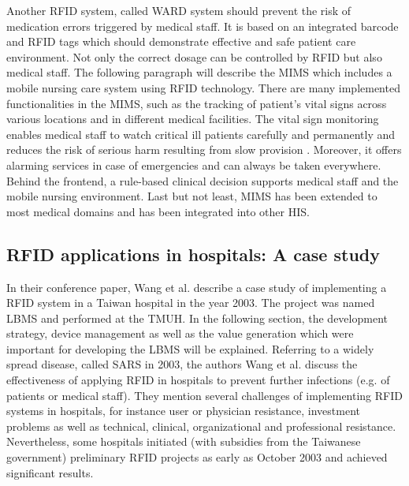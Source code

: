 Another RFID system, called \ac{WARD} system should prevent the risk of medication errors triggered by medical staff. It is based on an integrated barcode and RFID tags which should demonstrate effective and safe patient care environment. 
Not only the correct dosage can be controlled by RFID but also medical staff. The following paragraph will describe the \ac{MIMS} which includes a mobile nursing care system using RFID technology. There are many implemented functionalities in the MIMS, such as the tracking of patient's vital signs across various locations and in different medical facilities. The vital sign monitoring enables medical staff to watch critical ill patients carefully and permanently and reduces the risk of serious harm resulting from slow provision \cite{ncbi}. Moreover, it offers alarming services in case of emergencies and can always be taken everywhere. Behind the frontend, a rule-based clinical decision supports medical staff and the mobile nursing environment. Last but not least, MIMS has been extended to most medical domains and has been integrated into other HIS.

\subsection{RFID applications in hospitals: A case study}

In their conference paper, Wang et al. \cite{casestudy} describe a case study of implementing a RFID system in a Taiwan hospital in the year 2003. The project was named \ac{LBMS} and performed at the \ac{TMUH}. In the following section, the development strategy, device management as well as the value generation which were important for developing the LBMS will be explained. 
Referring to a widely spread disease, called \ac{SARS} in 2003, the authors Wang et al. discuss the effectiveness of applying RFID in hospitals to prevent further infections (e.g. of patients or medical staff). They mention several challenges of implementing RFID systems in hospitals, for instance user or physician resistance, investment problems as well as technical, clinical, organizational and professional resistance. Nevertheless, some hospitals initiated (with subsidies from the Taiwanese government) preliminary RFID projects as early as October 2003 and achieved significant results. 

